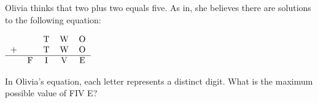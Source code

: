 Olivia thinks that two plus two equals five. As in, she believes there are solutions to the following equation:

$  \begin{tabular}{ccccc}
    & & T &  W & O \\ 
   + && T &  W & O\\ 
  \hline
    & F & I &  V & E  \\
  \end{tabular}
$

In Olivia's equation, each letter represents a distinct digit. What is the maximum possible value of FIV E?
